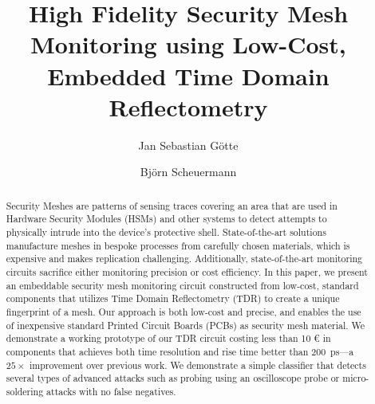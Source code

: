\documentclass[final]{iacrtrans}
\newcommand{\price}[2]{#1 #2}
\begin{document}
\author{Jan Sebastian Götte \and Björn Scheuermann}
\title{High Fidelity Security Mesh Monitoring using Low-Cost, Embedded Time Domain Reflectometry}
\maketitle



\begin{abstract}
    Security Meshes are patterns of sensing traces covering an area that are used in Hardware Security Modules (HSMs)
    and other systems to detect attempts to physically intrude into the device's protective shell. State-of-the-art
    solutions manufacture meshes in bespoke processes from carefully chosen materials, which is expensive and makes
    replication challenging. Additionally, state-of-the-art monitoring circuits sacrifice either monitoring precision or
    cost efficiency. In this paper, we present an embeddable security mesh monitoring circuit constructed from low-cost,
    standard components that utilizes Time Domain Reflectometry (TDR) to create a unique fingerprint of a mesh. Our
    approach is both low-cost and precise, and enables the use of inexpensive standard Printed Circuit Boards (PCBs) as
    security mesh material. We demonstrate a working prototype of our TDR circuit costing less than \price{10}{\euro} in
    components that achieves both time resolution and rise time better than \qty{200}{\pico\second}---a $25\times$
    improvement over previous work. We demonstrate a simple classifier that detects several types of advanced attacks
    such as probing using an oscilloscope probe or micro-soldering attacks with no false negatives.
\end{abstract}
\end{document}
